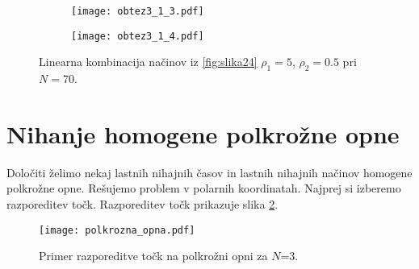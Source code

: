 \documentclass[12pt,a4paper]{article}
\begin{document}
\begin{figure}[H]
    \centering
    \begin{subfigure}[b]{0.49\textwidth}
        \texttt{[image: obtez3\_1\_3.pdf]}
    \end{subfigure}
    \begin{subfigure}[b]{0.49\textwidth}
        \texttt{[image: obtez3\_1\_4.pdf]}
    \end{subfigure}
    \caption{Linearna kombinacija načinov iz \ref{fig:slika24} $\rho_1= 5$, $\rho_2=0.5$ pri $N=70$.} \label{fig:slika25}
\end{figure}

\section*{Nihanje homogene polkrožne opne}

Določiti želimo nekaj lastnih nihajnih časov in lastnih nihajnih načinov homogene polkrožne opne. Rešujemo problem v polarnih koordinatah. Najprej si izberemo razporeditev točk. Razporeditev točk prikazuje slika \ref{fig:slika26}.

\begin{figure}[H]
\begin{center}
\texttt{[image: polkrozna\_opna.pdf]}
\caption{Primer razporeditve točk na polkrožni opni za $N$=3.} \label{fig:slika26}
\end{center}
\end{figure} 
\end{document}
